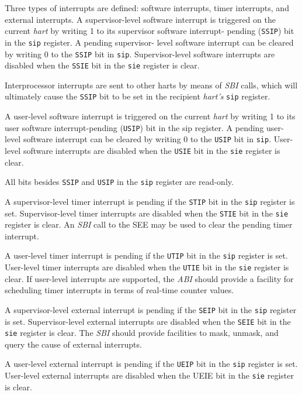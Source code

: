 \fi

Three types of interrupts are defined: software interrupts, timer interrupts,
and external interrupts. A supervisor-level software interrupt is triggered on
the current \emph{hart} by writing 1 to its supervisor software interrupt-
pending (\texttt{SSIP}) bit in the \texttt{sip} register. A pending supervisor-
level software interrupt can be cleared by writing 0 to the \texttt{SSIP} bit in
\texttt{sip}. Supervisor-level software interrupts are disabled when the
\texttt{SSIE} bit in the \texttt{sie} register is clear.

Interprocessor interrupts are sent to other harts by means of \emph{SBI}
calls, which will ultimately cause the \texttt{SSIP} bit to be set in the
recipient \emph{hart's} \texttt{sip} register.

A user-level software interrupt is triggered on the current \emph{hart} by
writing 1 to its user software interrupt-pending (\texttt{USIP}) bit in the sip
register. A pending user-level software interrupt can be cleared by writing 0 to
the \texttt{USIP} bit in \texttt{sip}. User-level software interrupts are
disabled when the \texttt{USIE} bit in the \texttt{sie} register is clear.

All bits besides \texttt{SSIP} and \texttt{USIP} in the \texttt{sip} register are read-only.

A supervisor-level timer interrupt is pending if the \texttt{STIP} bit in the
\texttt{sip} register is set. Supervisor-level timer interrupts are disabled
when the \texttt{STIE} bit in the \texttt{sie} register is clear. An \emph{SBI}
call to the SEE may be used to clear the pending timer interrupt.

A user-level timer interrupt is pending if the \texttt{UTIP} bit in the
\texttt{sip} register is set. User-level timer interrupts are disabled when the
\texttt{UTIE} bit in the \texttt{sie} register is clear. If user-level
interrupts are supported, the \emph{ABI} should provide a facility for
scheduling timer interrupts in terms of real-time counter values.

A supervisor-level external interrupt is pending if the \texttt{SEIP} bit in the
\texttt{sip} register is set. Supervisor-level external interrupts are disabled
when the \texttt{SEIE} bit in the \texttt{sie} register is clear. The \emph{SBI}
should provide facilities to mask, unmask, and query the cause of external
interrupts.

A user-level external interrupt is pending if the \texttt{UEIP} bit in the
\texttt{sip} register is set. User-level external interrupts are disabled when
the UEIE bit in the \texttt{sie} register is clear.


